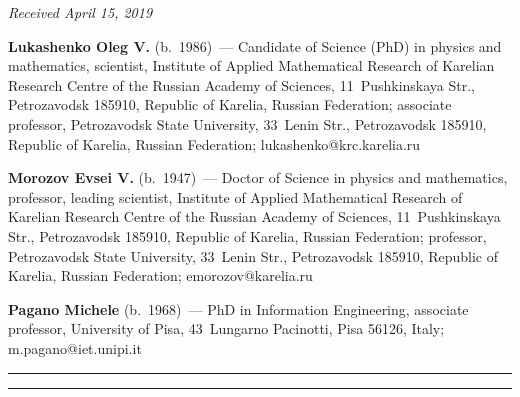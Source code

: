 \vspace*{-6pt}

\hfill{\small\textit{Received April 15, 2019}}

\vspace*{-18pt}

\Contr


\noindent
\textbf{Lukashenko Oleg  V.} (b.\ 1986)~--- 
Candidate of Science (PhD) in physics and mathematics, scientist, 
Institute of  Applied Mathematical Research of Karelian Research Centre of 
the Russian Academy of Sciences, 
11~Pushkinskaya Str.,  Petrozavodsk 185910, Republic of Karelia, 
Russian Federation; associate professor, Petrozavodsk State University, 33~Lenin Str., 
Petrozavodsk 185910, Republic of Karelia, Russian Federation; 
\mbox{lukashenko@krc.karelia.ru}

\vspace*{3pt}

\noindent
\textbf{Morozov  Evsei  V.} (b.\ 1947)~--- 
Doctor of Science in physics and mathematics, professor, leading scientist,
 Institute of  Applied Mathematical Research of Karelian Research Centre of 
 the Russian Academy of Sciences, 11~Pushkinskaya Str.,  Petrozavodsk 185910, 
 Republic of Karelia, Russian Federation; professor, Petrozavodsk State University, 
 33~Lenin Str., Petrozavodsk 185910, Republic of Karelia, Russian Federation; 
 \mbox{emorozov@karelia.ru}
 
 \vspace*{3pt}
 
 \noindent
 \textbf{Pagano Michele} (b.\ 1968)~--- 
 PhD in Information Engineering, associate professor, University of Pisa, 
 43~Lungarno Pacinotti, Pisa 56126, Italy; \mbox{m.pagano@iet.unipi.it}

 


\vspace*{8pt}

\hrule

\vspace*{2pt}

\hrule




\def\tit{ГАУССОВСКАЯ АППРОКСИМАЦИЯ ПРОЦЕССА РАСПРЕДЕЛЕННЫХ ВЫЧИСЛЕНИЙ$^*$}

\def\titkol{Гауссовская аппроксимация процесса распределенных вычислений}

